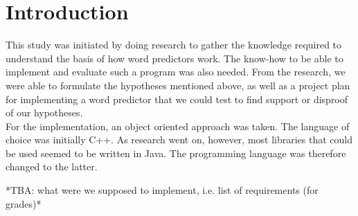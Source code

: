 \section{Introduction}
This study was initiated by doing research to gather the knowledge required to understand the basis of how word predictors work. The know-how to be able to implement and evaluate such a program was also needed. From the research, we were able to formulate the hypotheses mentioned above, as well as a project plan for implementing a word predictor that we could test to find support or disproof of our hypotheses.\\

For the implementation, an object oriented approach was taken. The language of choice was initially C++. As research went on, however, most libraries that could be used seemed to be written in Java. The programming language was therefore changed to the latter.

*TBA: what were we supposed to implement, i.e. list of requirements (for grades)*
\cite{frey}